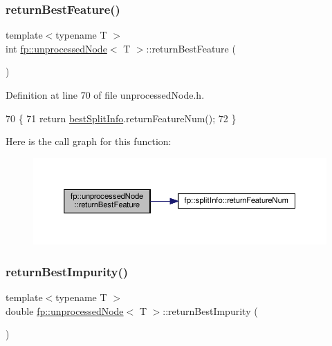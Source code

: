 \subsubsection{\texorpdfstring{return\+Best\+Feature()}{returnBestFeature()}\hspace{0.1cm}{\footnotesize\ttfamily [2/2]}}
{\footnotesize\ttfamily template$<$typename T $>$ \\
int \hyperlink{classfp_1_1unprocessedNode}{fp\+::unprocessed\+Node}$<$ T $>$\+::return\+Best\+Feature (\begin{DoxyParamCaption}{ }\end{DoxyParamCaption})\hspace{0.3cm}{\ttfamily [inline]}}



Definition at line 70 of file unprocessed\+Node.\+h.


\begin{DoxyCode}
70                                               \{
71                     \textcolor{keywordflow}{return} \hyperlink{classfp_1_1unprocessedNode_ae60e5f84c9a80537cb84dfd17e70e893}{bestSplitInfo}.returnFeatureNum();
72                 \}
\end{DoxyCode}
Here is the call graph for this function\+:
\nopagebreak
\begin{figure}[H]
\begin{center}
\leavevmode
\includegraphics[width=350pt]{classfp_1_1unprocessedNode_a32e9c381659db64022fa0491de48f70c_cgraph}
\end{center}
\end{figure}
\mbox{\label{classfp_1_1unprocessedNode_a1b147714de502bcff5c727d2ce9144f8}} 
\subsubsection{\texorpdfstring{return\+Best\+Impurity()}{returnBestImpurity()}\hspace{0.1cm}{\footnotesize\ttfamily [1/2]}}
{\footnotesize\ttfamily template$<$typename T $>$ \\
double \hyperlink{classfp_1_1unprocessedNode}{fp\+::unprocessed\+Node}$<$ T $>$\+::return\+Best\+Impurity (\begin{DoxyParamCaption}{ }\end{DoxyParamCaption})\hspace{0.3cm}{\ttfamily [inline]}}




